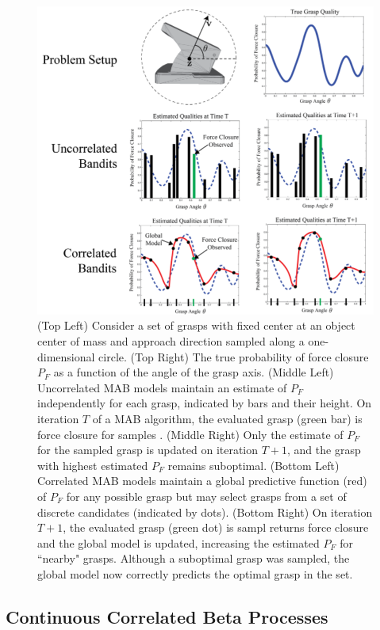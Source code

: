 \begin{figure}[t!]
\centering
\includegraphics[scale=0.22]{figures/illustrations/correlated_bandits.png}
\caption{(Top Left) Consider a set of grasps with fixed center at an object center of mass and approach direction sampled along a one-dimensional circle. (Top Right) The true probability of force closure $P_F$ as a function of the angle of the grasp axis. (Middle Left) Uncorrelated MAB models maintain an estimate of $P_F$ independently for each grasp, indicated by bars and their height. On iteration $T$ of a MAB algorithm, the evaluated grasp (green bar) is force closure for samples . (Middle Right) Only the estimate of $P_F$ for the sampled grasp is updated on iteration $T+1$, and the grasp with highest estimated $P_F$ remains suboptimal. (Bottom Left) Correlated MAB models maintain a global predictive function (red) of $P_F$ for any possible grasp but may select grasps from a set of discrete candidates (indicated by dots). (Bottom Right) On iteration $T+1$, the evaluated grasp (green dot) is sampl returns force closure and the global model is updated, increasing the estimated $P_F$ for ``nearby" grasps. Although a suboptimal grasp was sampled, the global model now correctly predicts the optimal grasp in the set. }
\vspace*{-15pt}
\end{figure}

\subsection{Continuous Correlated Beta Processes}

